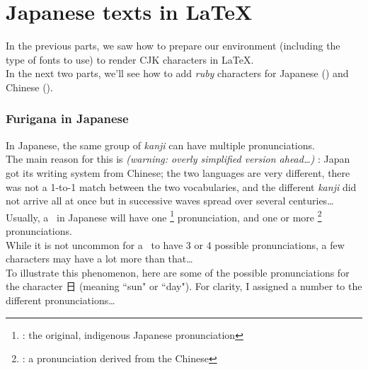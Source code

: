 
\part{Japanese texts in \LaTeX} \label{japanese}

\renewcommand{\currentPart}{Japanese texts in \LaTeX}

In the previous parts, we saw how to prepare our environment (including the type of fonts to use) to render CJK characters in \LaTeX. \\

In the next two parts, we'll see how to add \emph{ruby} characters for Japanese (\furigana) and Chinese (\ppinyin).

\section*{Furigana in Japanese}

In Japanese, the same group of \emph{kanji} can have multiple pronunciations. \\

The main reason for this is \emph{(warning: overly simplified version ahead\dots)} : Japan got its writing system from Chinese; the two languages are very different, there was not a 1-to-1 match between the two vocabularies, and the different \emph{kanji} did not arrive all at once but in successive waves spread over several centuries\dots \\

Usually, a \kanji\ in Japanese will have one \kunyomi\footnote{\kunyomi: the original, indigenous Japanese pronunciation} pronunciation, and one or more \onyomi\footnote{\onyomi: a pronunciation derived from the Chinese} pronunciations. \citep{onyomi-kunyomi} \\

While it is not uncommon for a \kanji\ to have 3 or 4 possible pronunciations, a few characters may have a lot more than that\dots\\ 

To illustrate this phenomenon, here are some of the possible pronunciations for the character 日 (meaning ``sun" or ``day"). For clarity, I assigned a number to the different pronunciations\dots

\newpage

